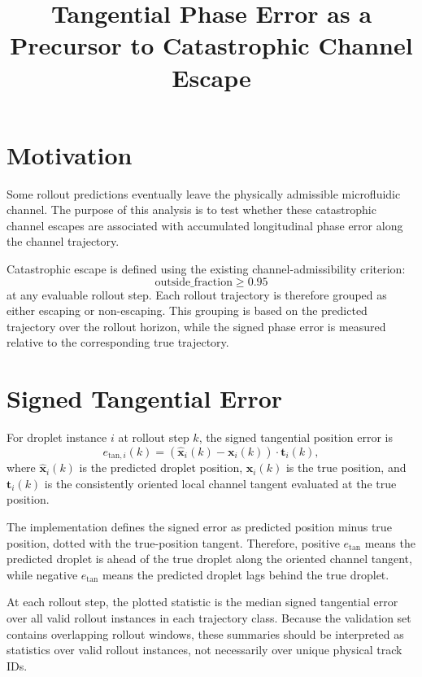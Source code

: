 \documentclass[11pt]{article}
\title{Tangential Phase Error as a Precursor to Catastrophic Channel Escape}
\author{}
\date{}
\begin{document}
\maketitle

\section{Motivation}

Some rollout predictions eventually leave the physically admissible
microfluidic channel. The purpose of this analysis is to test whether these
catastrophic channel escapes are associated with accumulated longitudinal
phase error along the channel trajectory.

Catastrophic escape is defined using the existing channel-admissibility
criterion:
\[
  \mathrm{outside\_fraction} \geq 0.95
\]
at any evaluable rollout step. Each rollout trajectory is therefore grouped as
either escaping or non-escaping. This grouping is based on the predicted
trajectory over the rollout horizon, while the signed phase error is measured
relative to the corresponding true trajectory.

\section{Signed Tangential Error}

For droplet instance \(i\) at rollout step \(k\), the signed tangential
position error is
\[
e_{\mathrm{tan},i}(k)
=
\left(
\hat{\mathbf{x}}_i(k)-\mathbf{x}_i(k)
\right)
\cdot
\mathbf{t}_i(k),
\]
where \(\hat{\mathbf{x}}_i(k)\) is the predicted droplet position,
\(\mathbf{x}_i(k)\) is the true position, and \(\mathbf{t}_i(k)\) is the
consistently oriented local channel tangent evaluated at the true position.

The implementation defines the signed error as predicted position minus true
position, dotted with the true-position tangent. Therefore, positive
\(e_{\mathrm{tan}}\) means the predicted droplet is ahead of the true droplet
along the oriented channel tangent, while negative \(e_{\mathrm{tan}}\) means
the predicted droplet lags behind the true droplet.

At each rollout step, the plotted statistic is the median signed tangential
error over all valid rollout instances in each trajectory class. Because the
validation set contains overlapping rollout windows, these summaries should be
interpreted as statistics over valid rollout instances, not necessarily over
unique physical track IDs.
\end{document}
